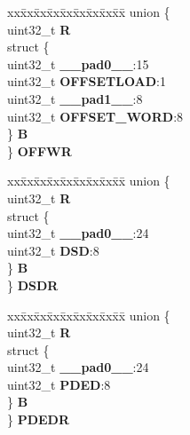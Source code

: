 \begin{DoxyCompactItemize}
\begin{tabbing}
\end{tabbing}\item 
\mbox{\label{structADC__tag_a5c7d2ae0747584834208453533ef6104}} 
\begin{tabbing}
xx\=xx\=xx\=xx\=xx\=xx\=xx\=xx\=xx\=\kill
union \{\\
\>uint32\_t {\bfseries R}\\
\>struct \{\\
\>\>uint32\_t {\bfseries \_\_pad0\_\_}:15\\
\>\>uint32\_t {\bfseries OFFSETLOAD}:1\\
\>\>uint32\_t {\bfseries \_\_pad1\_\_}:8\\
\>\>uint32\_t {\bfseries OFFSET\_WORD}:8\\
\>\} {\bfseries B}\\
\} {\bfseries OFFWR}\\

\end{tabbing}\item 
\mbox{\label{structADC__tag_a85d27003a4479575e8abf55103fc00b4}} 
\begin{tabbing}
xx\=xx\=xx\=xx\=xx\=xx\=xx\=xx\=xx\=\kill
union \{\\
\>uint32\_t {\bfseries R}\\
\>struct \{\\
\>\>uint32\_t {\bfseries \_\_pad0\_\_}:24\\
\>\>uint32\_t {\bfseries DSD}:8\\
\>\} {\bfseries B}\\
\} {\bfseries DSDR}\\

\end{tabbing}\item 
\mbox{\label{structADC__tag_a32d200eb1bb5a262357ec214908a3fd6}} 
\begin{tabbing}
xx\=xx\=xx\=xx\=xx\=xx\=xx\=xx\=xx\=\kill
union \{\\
\>uint32\_t {\bfseries R}\\
\>struct \{\\
\>\>uint32\_t {\bfseries \_\_pad0\_\_}:24\\
\>\>uint32\_t {\bfseries PDED}:8\\
\>\} {\bfseries B}\\
\} {\bfseries PDEDR}\\


\end{tabbing}
\end{DoxyCompactItemize}
